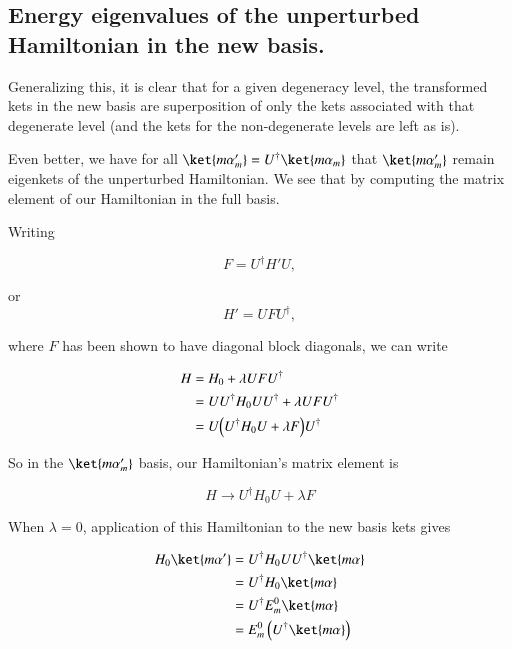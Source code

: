\subsection{Energy eigenvalues of the unperturbed Hamiltonian in the new basis.}

Generalizing this, it is clear that for a given degeneracy level, the transformed kets in the new basis are superposition of only the kets associated with that degenerate level (and the kets for the non-degenerate levels are left as is).

Even better, we have for all $\ket{m \alpha_m'} = U^\dagger \ket{m \alpha_m}$ that $\ket{m \alpha_m'}$ remain eigenkets of the unperturbed Hamiltonian.  We see that by computing the matrix element of our Hamiltonian in the full basis.

Writing

\begin{equation}\label{eqn:pertubationDegeneracy:410}
F = U^\dagger H' U,
\end{equation}

or
\begin{equation}\label{eqn:pertubationDegeneracy:430}
H' = U F U^\dagger,
\end{equation}

where $F$ has been shown to have diagonal block diagonals, we can write

\begin{align*}
H 
&= H_0 + \lambda U F U^\dagger \\
&= U U^\dagger H_0 U U^\dagger + \lambda U F U^\dagger \\
&= U \Bigl( U^\dagger H_0 U + \lambda F \Bigr) U^\dagger 
\end{align*}

So in the $\ket{m \alpha_m'}$ basis, our Hamiltonian's matrix element is

\begin{equation}\label{eqn:pertubationDegeneracy:470}
H \rightarrow U^\dagger H_0 U + \lambda F 
\end{equation}

When $\lambda = 0$, application of this Hamiltonian to the new basis kets gives

\begin{align*}
H_0 
\ket{m \alpha'} 
&=
U^\dagger H_0 U 
U^\dagger
\ket{m \alpha}  \\
&=
U^\dagger H_0
\ket{m \alpha}  \\
&=
U^\dagger E_m^0
\ket{m \alpha}  \\
&=
E_m^0
\left(
U^\dagger 
\ket{m \alpha}\right)  \\
\end{align*}

